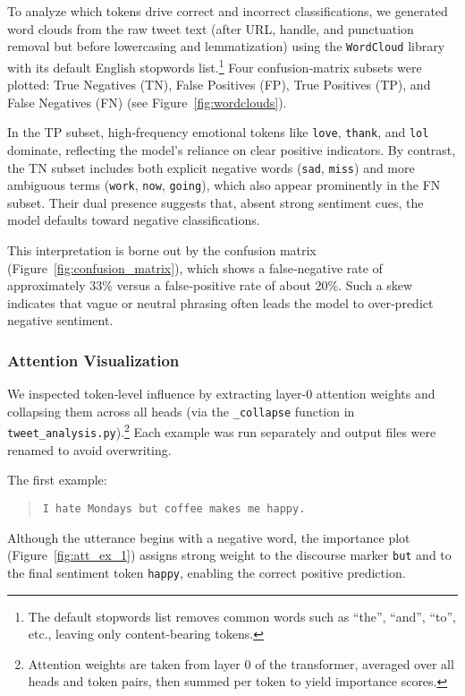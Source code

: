 \documentclass[twocolumn,superscriptaddress,aps]{revtex4-1}
\begin{document}
To analyze which tokens drive correct and incorrect classifications, we generated word clouds from the raw tweet text (after URL, handle, and punctuation removal but before lowercasing and lemmatization) using the \texttt{WordCloud} library with its default English stopwords list.\footnote{The default stopwords list removes common words such as “the”, “and”, “to”, etc., leaving only content-bearing tokens.} Four confusion‐matrix subsets were plotted: True Negatives (TN), False Positives (FP), True Positives (TP), and False Negatives (FN) (see Figure~\ref{fig:wordclouds}).

In the TP subset, high‐frequency emotional tokens like \texttt{love}, \texttt{thank}, and \texttt{lol} dominate, reflecting the model’s reliance on clear positive indicators. By contrast, the TN subset includes both explicit negative words (\texttt{sad}, \texttt{miss}) and more ambiguous terms (\texttt{work}, \texttt{now}, \texttt{going}), which also appear prominently in the FN subset. Their dual presence suggests that, absent strong sentiment cues, the model defaults toward negative classifications.

This interpretation is borne out by the confusion matrix (Figure~\ref{fig:confusion_matrix}), which shows a false‐negative rate of approximately 33\% versus a false‐positive rate of about 20\%. Such a skew indicates that vague or neutral phrasing often leads the model to over‐predict negative sentiment.

\subsubsection{Attention Visualization}

We inspected token‐level influence by extracting layer-0 attention weights and collapsing them across all heads (via the \texttt{\_collapse} function in \texttt{tweet\_analysis.py}).\footnote{Attention weights are taken from layer 0 of the transformer, averaged over all heads and token pairs, then summed per token to yield importance scores.} Each example was run separately and output files were renamed to avoid overwriting.

The first example:
\begin{quote}
\texttt{I hate Mondays but coffee makes me happy.}
\end{quote}
Although the utterance begins with a negative word, the importance plot (Figure~\ref{fig:att_ex_1}) assigns strong weight to the discourse marker \texttt{but} and to the final sentiment token \texttt{happy}, enabling the correct positive prediction.
\end{document}
